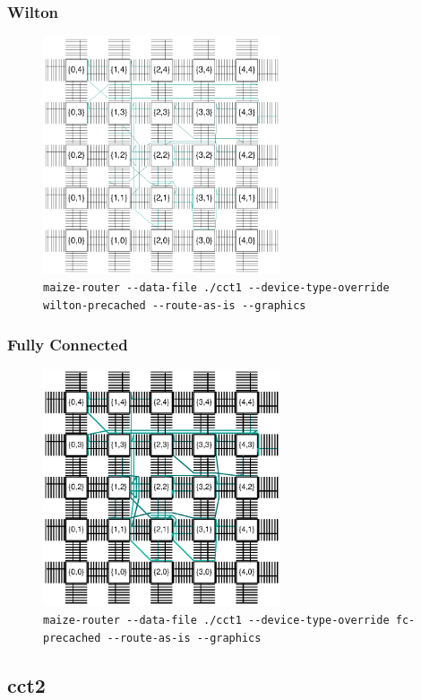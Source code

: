 \documentclass[11pt]{article}
\begin{document}
\subsubsection{Wilton}
\begin{figure}[H]
\centering
\includegraphics[clip, viewport=170 255 445 529, width=7cm]{assets/wilton-cct1-as-is}
\cprotect\caption{\small\verb|maize-router --data-file ./cct1 --device-type-override wilton-precached --route-as-is --graphics|}
\end{figure}

\subsubsection{Fully Connected}
\begin{figure}[H]
\centering
\includegraphics[clip, viewport=164 246 455 538, width=7cm]{assets/fc-cct1-as-is}
\cprotect\caption{\small\verb|maize-router --data-file ./cct1 --device-type-override fc-precached --route-as-is --graphics|}
\end{figure}

\subsection{cct2}
\end{document}
